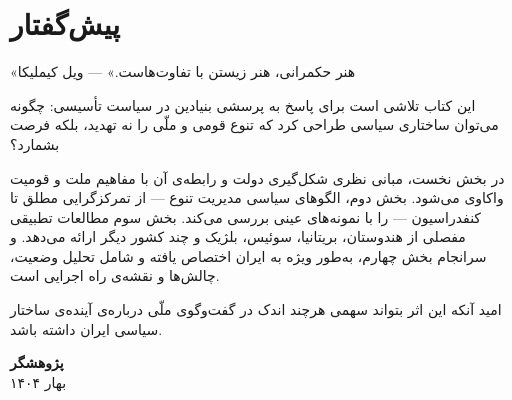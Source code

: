 






\frontmatter
\tableofcontents
\clearpage
\listoffigures
\clearpage
\listoftables

\chapter*{پیش‌گفتار}

\begin{quotebox}
«هنر حکمرانی، هنر زیستن با تفاوت‌هاست.»
\hfill — ویل کیملیکا
\end{quotebox}

\vspace{6pt}

این کتاب تلاشی است برای پاسخ به پرسشی بنیادین در سیاست تأسیسی:
چگونه می‌توان ساختاری سیاسی طراحی کرد که تنوع قومی و ملّی را نه تهدید، بلکه فرصت بشمارد؟

در بخش نخست، مبانی نظری شکل‌گیری دولت و رابطه‌ی آن با مفاهیم ملت و قومیت واکاوی می‌شود. بخش دوم، الگوهای سیاسی مدیریت تنوع — از تمرکزگرایی مطلق تا کنفدراسیون — را با نمونه‌های عینی بررسی می‌کند. بخش سوم مطالعات تطبیقی مفصلی از هندوستان، بریتانیا، سوئیس، بلژیک و چند کشور دیگر ارائه می‌دهد. و سرانجام بخش چهارم، به‌طور ویژه به ایران اختصاص یافته و شامل تحلیل وضعیت، چالش‌ها و نقشه‌ی راه اجرایی است.

\simplesep

\vspace{6pt}
امید آنکه این اثر بتواند سهمی هرچند اندک در گفت‌وگوی ملّی درباره‌ی آینده‌ی ساختار سیاسی ایران داشته باشد.

\vspace{1cm}
\begin{flushleft}
\textcolor{PrimaryDark}{\bfseries پژوهشگر}\\
بهار ۱۴۰۴
\end{flushleft}

\mainmatter













\backmatter



\printbibliography[
  heading=bibintoc,
  title={کتاب‌نامه}
]

\printindex

